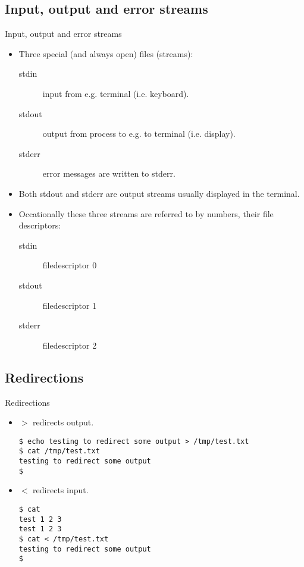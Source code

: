 \documentclass{beamer}
\begin{document}
\subsection{Input, output and error streams}
\begin{frame}{Input, output and error streams}
	\begin{itemize}
		\item<1-> Three special (and always open) files (streams):
			\begin{description}
				\item[stdin] input from e.g. terminal (i.e. keyboard).
				\item[stdout] output from process to e.g. to terminal (i.e.  display).
				\item[stderr] error messages are written to stderr.
			\end{description}
		\item<2> Both stdout and stderr are output streams usually displayed in the 
			terminal.
		\item<3> Occationally these three streams are referred to by numbers, their 
			file descriptors:
			\begin{description}
				\item[stdin] filedescriptor 0
				\item[stdout] filedescriptor 1
				\item[stderr] filedescriptor 2
			\end{description}
	\end{itemize}
\end{frame}

\subsection{Redirections}
\begin{frame}[fragile]{Redirections}
	\begin{itemize}
		\item<1> $>$ redirects output.
			\begin{lstlisting}
$ echo testing to redirect some output > /tmp/test.txt
$ cat /tmp/test.txt
testing to redirect some output
$
			\end{lstlisting}
		\item<2> $<$ redirects input.
			\begin{lstlisting}
$ cat
test 1 2 3
test 1 2 3
$ cat < /tmp/test.txt
testing to redirect some output
$
			\end{lstlisting}
	\end{itemize}
\end{frame}
\end{document}
